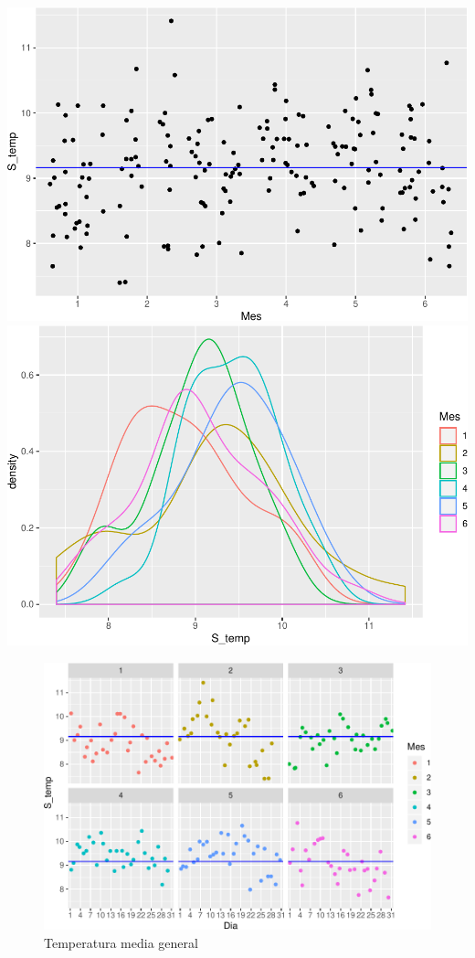 \documentclass[conference,final,]{IEEEtran}
\makeatletter
\def\maxwidth{\ifdim\Gin@nat@width>\linewidth\linewidth
\else\Gin@nat@width\fi}
\let\Oldincludegraphics\includegraphics
\renewcommand{\includegraphics}[1]{\Oldincludegraphics[width=\maxwidth]{#1}}
\makeatother
\begin{document}
\includegraphics{Hidrology_files/figure-latex/unnamed-chunk-4-1.pdf}
\includegraphics{Hidrology_files/figure-latex/unnamed-chunk-4-2.pdf}

\begin{figure}
\centering
\includegraphics{Hidrology_files/figure-latex/unnamed-chunk-5-1.pdf}
\caption{Temperatura media general}
\end{figure}
\end{document}
